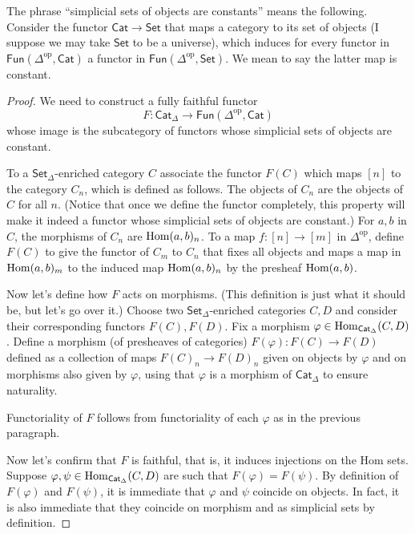\begin{remark}
\label{remark-induced-functor-on-objects}
The phrase ``simplicial sets of objects are constants''
means the following. Consider the functor
$\mathsf{Cat} \to \mathsf{Set}$ that maps a category to its set
of objects (I suppose we may take $\mathsf{Set}$ to be a universe),
which induces for every functor in
$\mathsf{Fun}(\Delta^{\text{op}},\mathsf{Cat})$ 
a functor in $\mathsf{Fun}(\Delta^{\text{op}},\mathsf{Set})$.
We mean to say the latter map is constant.
\end{remark}

\begin{proof}
We need to construct a fully faithful functor
$$
F:\mathsf{Cat}_\Delta \to \mathsf{Fun}(\Delta^{\text{op}},\mathsf{Cat})
$$
whose image is the subcategory of functors 
whose simplicial sets of objects are constant.

To a $\mathsf{Set}_\Delta$-enriched category $C$ 
associate the functor $F(C)$ which maps $[n]$ 
to the category $C_n$, which is defined as follows.
The objects of $C_n$ are the objects of $C$ for all $n$.
(Notice that once we define the functor completely,
this property will make it indeed a functor whose simplicial
sets of objects are constant.) 
For $a,b$ in $C$, the morphisms of $C_n$ 
are $\mathop{\mathrm{Hom}}\nolimits(a,b)_n$. To a map $f:[n] \to [m]$ in $\Delta^{\text{op}}$,
define $F(C)$ to give the functor of $C_m$ to $C_n$ that fixes
all objects and maps a map in $\mathop{\mathrm{Hom}}\nolimits(a,b)_m$ 
to the induced map $\mathop{\mathrm{Hom}}\nolimits(a,b)_n$ by the presheaf
$\mathop{\mathrm{Hom}}\nolimits(a,b)$.

Now let's define how $F$ acts on morphisms. 
(This definition is just what it should be, but let's go over it.)
Choose two
$\mathsf{Set}_\Delta$-enriched categories $C,D$ 
and consider their corresponding functors $F(C),F(D)$.
Fix a morphism $\varphi \in \mathop{\mathrm{Hom}}\nolimits_{\mathsf{Cat}_\Delta}(C,D)$.
Define a morphism (of presheaves of categories) 
$F(\varphi):F(C) \to F(D)$
defined as a collection of maps $F(C)_n \to F(D)_n$
given on objects by $\varphi$ and on morphisms
also given by $\varphi$, using that $\varphi$ is a morphism
of $\mathsf{Cat}_\Delta$ to ensure naturality.

Functoriality of $F$ follows from functoriality of each $\varphi$ as in the
previous paragraph.

Now let's confirm that $F$ is faithful, that is, it induces injections
on the Hom sets. Suppose $\varphi,\psi \in \mathop{\mathrm{Hom}}\nolimits_{\mathsf{Cat}_\Delta}(C,D)$ 
are such that $F(\varphi)=F(\psi)$. By definition of $F(\varphi)$ and
 $F(\psi)$, it is immediate that $\varphi$ and $\psi$ coincide on objects.
In fact, it is also immediate that they coincide on morphism and as
simplicial sets by definition.


\end{proof}

